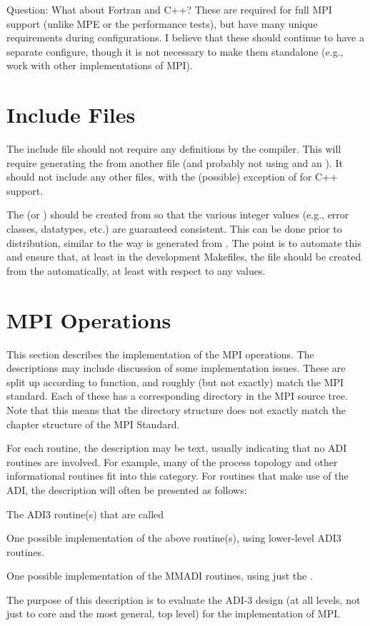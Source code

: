 \documentclass{article}
\begin{document}
Question: What about Fortran and C++?  These are required for full MPI support
(unlike MPE or the performance tests), but have many unique requirements
during configurations.  I believe that these should continue to have a
separate configure, though it is not necessary to make them standalone (e.g.,
work with other implementations of MPI).

\section{Include Files}
The include file  should not require any 
definitions by the compiler.  This will require generating the
 from another file (and probably not using  and an
).  It should not include any other
files, with the (possible) exception of  for C++ support.

The  (or ) should be created from
 so that the various integer values (e.g., error classes,
datatypes, etc.) are guaranteed consistent.  This can be done prior to
distribution, similar to the way  is generated from
.  The point is to automate this and ensure that,
at least in the development Makefiles, the  file
should be created from the  automatically, at least with
respect to any values. 

\section{MPI Operations}
This section describes the implementation of the MPI operations.  The
descriptions may include discussion of some implementation issues.
These are split up according to function, and roughly (but not
exactly) match the MPI standard.  Each of these has a corresponding
directory in the MPI source tree.  Note that this means that the
directory structure does not exactly match the chapter structure of
the MPI Standard.

For each routine, the description may be text, usually indicating that no ADI
routines are involved.  For example, many of the process topology and other
informational routines fit into this category.
For routines that make use of the ADI, the description will often be presented
as follows:
\begin{adi3}The ADI3 routine(s) that are called
\begin{mmadi}One possible implementation of the above routine(s), using
  lower-level ADI3 routines.
\begin{core}One possible implementation of the MMADI routines, using just the
  . 
\end{core}
\end{mmadi}
\end{adi3}
The purpose of this description is to evaluate the ADI-3 design (at all
levels, not just to core and the most general, top level) for the
implementation of MPI.  
\end{document}
